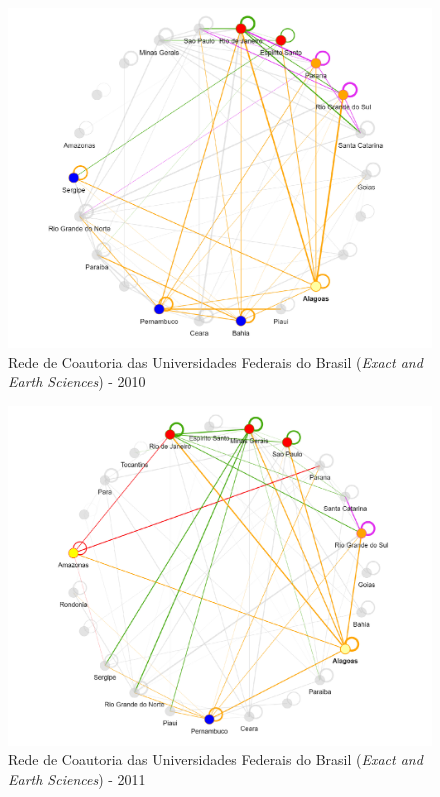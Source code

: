 \begin{figure}[H]
	\centering
	\includegraphics[scale=0.6]{Imagens/rede-exact-AL-2010.pdf}
	\caption{Rede de Coautoria das Universidades Federais do Brasil (\textit{Exact and Earth Sciences}) - 2010}
	\label{Rede de Coautoria - UF EXACT AL 2010}
\end{figure}

\begin{figure}[H]
	\centering
	\includegraphics[scale=0.6]{Imagens/rede-exact-AL-2011.pdf}
	\caption{Rede de Coautoria das Universidades Federais do Brasil (\textit{Exact and Earth Sciences}) - 2011}
	\label{Rede de Coautoria - UF EXACT AL 2012}
\end{figure}


